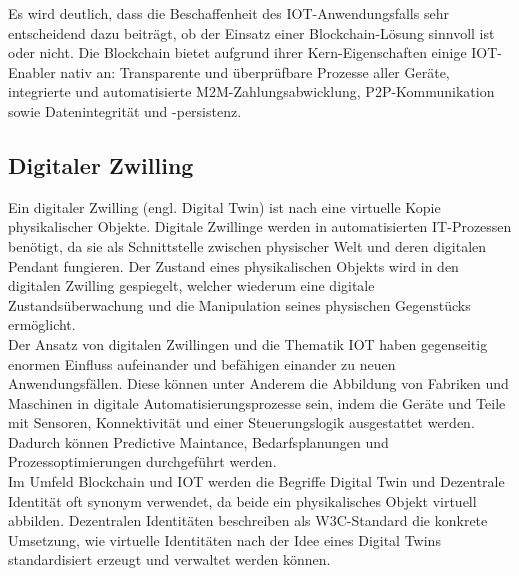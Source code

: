 Es wird deutlich, dass die Beschaffenheit des \ac{IOT}-Anwendungsfalls sehr entscheidend dazu beiträgt, ob der Einsatz einer Blockchain-Lösung sinnvoll ist oder nicht. Die Blockchain bietet aufgrund ihrer Kern-Eigenschaften einige IOT-Enabler nativ an: Transparente und überprüfbare Prozesse aller Geräte, integrierte und automatisierte \ac{M2M}-Zahlungsabwicklung, \ac{P2P}-Kommunikation sowie Datenintegrität und -persistenz.

\subsection{Digitaler Zwilling}
\label{subsec:fundamentals:iot:digitaltwins}
Ein digitaler Zwilling (engl. Digital Twin) ist nach \citeauthor{deloitte2018} eine virtuelle Kopie physikalischer Objekte. Digitale Zwillinge werden in automatisierten IT-Prozessen benötigt, da sie als Schnittstelle zwischen physischer Welt und deren digitalen Pendant fungieren. Der Zustand eines physikalischen Objekts wird in den digitalen Zwilling gespiegelt, welcher wiederum eine digitale Zustandsüberwachung und die Manipulation seines physischen Gegenstücks ermöglicht. \cite{deloitte2018}\\
Der Ansatz von digitalen Zwillingen und die Thematik \ac{IOT} haben gegenseitig enormen Einfluss aufeinander und befähigen einander zu neuen Anwendungsfällen. Diese können unter Anderem die Abbildung von Fabriken und Maschinen in digitale Automatisierungsprozesse sein, indem die Geräte und Teile mit Sensoren, Konnektivität und einer Steuerungslogik ausgestattet werden. Dadurch können Predictive Maintance, Bedarfsplanungen und Prozessoptimierungen durchgeführt werden.\\
Im Umfeld Blockchain und \ac{IOT} werden die Begriffe Digital Twin und Dezentrale Identität oft synonym verwendet, da beide ein physikalisches Objekt virtuell abbilden. Dezentralen Identitäten beschreiben als \ac{W3C}-Standard die konkrete Umsetzung, wie virtuelle Identitäten nach der Idee eines Digital Twins standardisiert erzeugt und verwaltet werden können.
